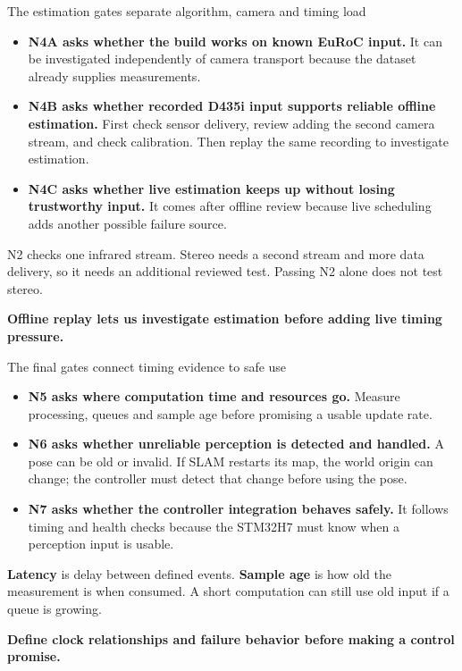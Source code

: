 \documentclass[aspectratio=169,12pt,t]{beamer}
\newcommand{\para}[1]{#1\par\medskip}
\newcommand{\lesson}[1]{\vfill{\color{teal!70!black}\bfseries #1}\par}
\begin{document}
\begin{frame}{The estimation gates separate algorithm, camera and timing load}

\begin{itemize}
\item \textbf{N4A asks whether the build works on known EuRoC input.} It can be investigated independently of camera transport because the dataset already supplies measurements.
\item \textbf{N4B asks whether recorded D435i input supports reliable offline estimation.} First check sensor delivery, review adding the second camera stream, and check calibration. Then replay the same recording to investigate estimation.
\item \textbf{N4C asks whether live estimation keeps up without losing trustworthy input.} It comes after offline review because live scheduling adds another possible failure source.
\end{itemize}
\para{N2 checks one infrared stream. Stereo needs a second stream and more data delivery, so it needs an additional reviewed test. Passing N2 alone does not test stereo.}
\lesson{Offline replay lets us investigate estimation before adding live timing pressure.}

\end{frame}

\begin{frame}{The final gates connect timing evidence to safe use}

\begin{itemize}
\item \textbf{N5 asks where computation time and resources go.} Measure processing, queues and sample age before promising a usable update rate.
\item \textbf{N6 asks whether unreliable perception is detected and handled.} A pose can be old or invalid. If SLAM restarts its map, the world origin can change; the controller must detect that change before using the pose.
\item \textbf{N7 asks whether the controller integration behaves safely.} It follows timing and health checks because the STM32H7 must know when a perception input is usable.
\end{itemize}
\para{\textbf{Latency} is delay between defined events. \textbf{Sample age} is how old the measurement is when consumed. A short computation can still use old input if a queue is growing.}
\lesson{Define clock relationships and failure behavior before making a control promise.}

\end{frame}
\end{document}
